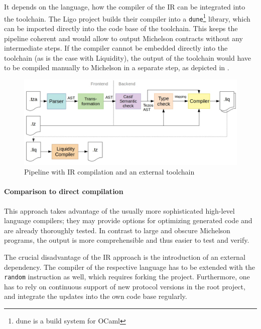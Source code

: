 It depends on the language, how the compiler of the IR can be integrated into the toolchain. The Ligo project builds their compiler into a \texttt{dune}\footnote{dune \cite{dune} is a build system for OCaml} library, which can be imported directly into the code base of the toolchain. This keeps the pipeline coherent and would allow to output Michelson contracts without any intermediate steps. If the compiler cannot be embedded directly into the toolchain (as is the case with Liquidity), the output of the toolchain would have to be compiled manually to Michelson in a separate step, as depicted in .

\begin{figure}[h]
\centering
\includegraphics[width=\linewidth]{figures/5-offline_tezos/pipeline_liq}
\caption{Pipeline with IR compilation and an external toolchain}
\label{fig:pipeline_liq}
\end{figure}

\paragraph{Comparison to direct compilation}
This approach takes advantage of the usually more sophisticated high-level language compilers; they may provide options for optimizing generated code and are already thoroughly tested. In contrast to large and obscure Michelson programs, the output is more comprehensible and thus easier to test and verify.

The crucial disadvantage of the IR approach is the introduction of an external dependency. The compiler of the respective language has to be extended with the \texttt{random} instruction as well, which requires forking the project. Furthermore, one has to rely on continuous support of new protocol versions in the root project, and integrate the updates into the own code base regularly.

